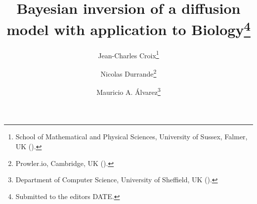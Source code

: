 

\usepackage{lipsum}
\usepackage{amsfonts}
\usepackage{graphicx}
\usepackage{epstopdf}
\usepackage{algorithmic}
\ifpdf
\else
\fi

\graphicspath{{./Figures/}}

\usepackage{enumitem}

\newcommand{\creflastconjunction}{, and~}



\title{Bayesian inversion of a diffusion model with application to Biology\thanks{Submitted to the editors DATE.
}}

\author{Jean-Charles Croix\thanks{School of Mathematical and Physical Sciences, University of Sussex, Falmer, UK 
  ().}
\and Nicolas Durrande\thanks{Prowler.io, Cambridge, UK 
  ().}
\and Mauricio A. \'Alvarez\thanks{Department of Computer Science, University of Sheffield, UK 
  ().}}

\usepackage{amsopn}
\DeclareMathOperator{\diag}{diag}


